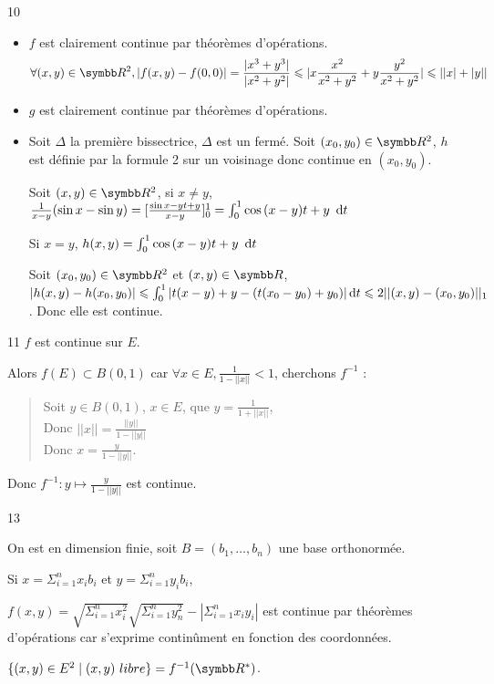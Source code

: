 \begin{correction}{10}
\begin{itemize}
    \item $f$ est clairement continue par théorèmes d'opérations.
    \[
        \forall (x,y) \in \R^2, | f(x,y) - f(0,0)| = \frac{|x^3 + y^3|}{|x^2 + y^2|} 
        \leqslant | x \frac {x^2} {x^2 + y^2} + y \frac{y^2}{x^2 + y^2} | 
        \leqslant ||x| + |y||
    \]

    \item $g$ est clairement continue par théorèmes d'opérations.
    \item Soit $\Delta$ la première bissectrice, $\Delta$ est un fermé.
        Soit $(x_0, y_0) \in \R^2$, $h$ est définie par la formule 2 sur un voisinage donc continue en $(x_0,y_0)$.

        Soit $(x,y) \in \R^2$, si $x \not \equal y$, 
        $\frac 1 {x - y} (\sin x - \sin y) = [\frac{\sin{x-y}t + y}{x - y}]_0^1 = \int_0^1 \cos{(x-y)t + y}~\,\mathrm{d}t$ 
        
        Si $x \equal y$, $h(x,y) = \int_0^1 \cos{(x-y)t + y}~\,\mathrm{d}t$

        Soit $(x_0, y_0) \in \R^2$ et $(x,y) \in \R$, 
        $|h(x,y) - h(x_0,y_0)| \leqslant \int_0^1 |t(x-y) + y - (t(x_0 - y_0) + y_0)|\,\mathrm{d}t \leqslant 2 ||(x,y) - (x_0,y_0)||_1$.
        Donc elle est continue.
\end{itemize}
\end{correction}

\begin{correction}{11}
    $f$ est continue sur $E$.

    Alors $f(E) \subset B(0,1)$ car $\forall x \in E, \frac 1 {1 - ||x||} < 1$, cherchons $f^{-1}$ :

    \begin{quote}
        Soit $y \in B(0,1)$, $x \in E$, que $ y = \frac 1 {1 + ||x||}$, \\
        Donc $||x|| = \frac{||y||}{1 - ||y||}$ \\
        Donc $x = \frac y {1 - ||y||}$. 
    \end{quote}

    Donc $f^{-1} : y \mapsto \frac y {1 - ||y||}$ est continue.
\end{correction}

\begin{correction}{13}

    On est en dimension finie, soit $B = (b_1, \dots, b_n)$ une base orthonormée.

    Si $x = \Sigma_{i = 1}^n x_ib_i$ et $y = \Sigma_{i = 1}^n y_ib_i$,

    $f(x,y) = \sqrt{\Sigma_{i = 1}^n x_i^2}\sqrt{\Sigma_{i = 1}^n y_n^2} - | \Sigma_{i=1}^n x_iy_i|$ 
    est continue par théorèmes d'opérations car s'exprime continûment en fonction des coordonnées.  

    $\{(x,y) \in E^2 \mid (x,y)~libre\} = f^{-1}(\R^{*})$.
\end{correction}

